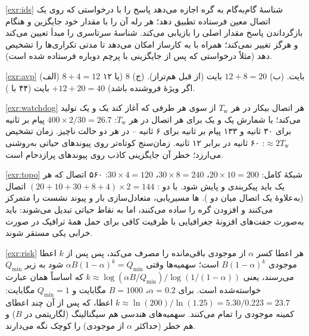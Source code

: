 \documentclass[11pt,a4paper]{article}
\begin{document}
\begin{solutionbox}{\ref{exr:ids}}
شناسهٔ گام‌به‌گام به گره اجازه می‌دهد پاسخ را با درخواستی که روی یک اتصال معین فرستاده تطبیق دهد؛ هر رله آن را با مقدار
خود جایگزین و هنگام بازگرداندن پاسخ مقدار اصلی را بازیابی می‌کند. شناسهٔ سرتاسری را مبدأ تعیین می‌کند و هرگز تغییر
نمی‌کند؛ همراه با  به کارساز امکان می‌دهد تا مدتی تکراری‌ها را تشخیص دهد (مثلاً درخواستی که پس از
جایگزینی با پرچم  دوباره فرستاده شده است).
\end{solutionbox}

\begin{solutionbox}{\ref{exr:avp}}
(الف) $8+4 = 12$ بایت. (ب) $12 + 8 = 20$ بایت (از قبل هم‌تراز). (ج) $8$ (یا ۱۲ اگر ویژهٔ فروشنده باشد) $+12+20 = 40$
بایت (۴۴ با ).
\end{solutionbox}

\begin{solutionbox}{\ref{exr:watchdog}}
هر اتصال بیکار در هر $T_\mathrm{w}$ از سوی هر طرفی که آغاز کند یک  و یک  تولید می‌کند؛ با شمارش یک
 و یک  برای هر اتصال در هر $T_\mathrm{w}$: $400\times2/30 = 26.7$ پیام بر ثانیه برای ۳۰ ثانیه و ۱۳۳ پیام
بر ثانیه برای ۶ ثانیه -- در هر دو حالت ناچیز. زمان تشخیص $\approx 2T_\mathrm{w}$: ۶۰ ثانیه در برابر ۱۲ ثانیه. زمان‌سنج
کوتاه‌تر روی پیوندهای حیاتی به‌روشنی می‌ارزد؛ خطر آن جایگزینی کاذب روی پیوندهای پرازدحام است.
\end{solutionbox}

\begin{solutionbox}{\ref{exr:topo}}
شبکهٔ کامل:  $20\times10 = 200$،  $30\times8 = 240$،  $30\times4 = 120$: ۵۶۰ اتصال که هر یک باید
پیکربندی و پایش شود. با دو : $(20+10+30+8+4)\times2 = 144$ اتصال (به‌علاوهٔ یک اتصال میان دو ).
ها مسیریابی، متعادل‌سازی بار و پیوند نشست را متمرکز می‌کنند و افزودن گره را ساده می‌کنند، اما به نقاط
حیاتی تبدیل می‌شوند: باید به‌صورت جفت‌های افزونهٔ جغرافیایی با ظرفیت کافی برای حمل همهٔ ترافیک در صورت خرابی یکی
مستقر شوند.
\end{solutionbox}

\begin{solutionbox}{\ref{exr:risk}}
هر اعطا کسر $\alpha$ از موجودی باقی‌مانده را مصرف می‌کند، پس پس از $k$ اعطا موجودی $B(1-\alpha)^k$ است؛ سهمیه‌ها وقتی
$\alpha B(1-\alpha)^k = Q_{\min}$ شود به زیر $Q_{\min}$ می‌رسند، یعنی
$k \approx \log(\alpha B/Q_{\min})/\log(1/(1-\alpha))$ که اساساً همان عبارت خواسته‌شده است. برای $\alpha=0.2$،
$B = 1000$ مگابایت و $Q_{\min} = 1$ مگابایت: $k \approx \ln(200)/\ln(1.25) = 5.30/0.223 = 23.7$ اعطا، که پس از آن چند
اعطای کمینه موجودی را تمام می‌کنند. سهمیه‌های هندسی هم سیگنالینگ (لگاریتمی در $B$) و هم خطر (حداکثر $\alpha$ از
موجودی) را کوچک نگه می‌دارند.
\end{solutionbox}
\end{document}
